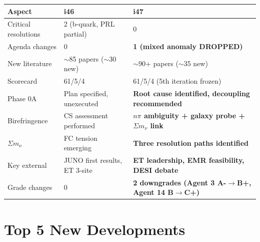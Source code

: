 \documentclass[11pt,a4paper]{article}
\begin{document}
\begin{center}
\begin{tabular}{lll}
\toprule
\textbf{Aspect} & \textbf{i46} & \textbf{i47} \\
\midrule
Critical resolutions & 2 (b-quark, PRL partial) & 0 \\
Agenda changes & 0 & \textbf{1 (mixed anomaly DROPPED)} \\
New literature & $\sim$85 papers ($\sim$30 new) & $\sim$90+ papers ($\sim$35 new) \\
Scorecard & 61/5/4 & 61/5/4 (5th iteration frozen) \\
Phase 0A & Plan specified, unexecuted & \textbf{Root cause identified, decoupling recommended} \\
Birefringence & CS assessment performed & \textbf{$n\pi$ ambiguity + galaxy probe + $\Sigma m_\nu$ link} \\
$\Sigma m_\nu$ & FC tension emerging & \textbf{Three resolution paths identified} \\
Key external & JUNO first results, ET 3-site & \textbf{ET leadership, EMR feasibility, DESI debate} \\
Grade changes & 0 & \textbf{2 downgrades (Agent 3 A-$\to$B+, Agent 14 B$\to$C+)} \\
\bottomrule
\end{tabular}
\end{center}

\section{Top 5 New Developments}
\end{document}
